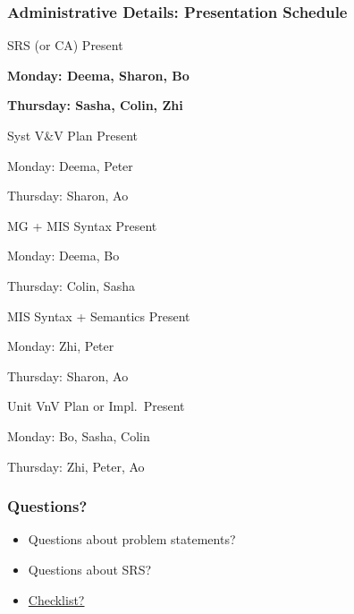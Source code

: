 \documentclass[t,12pt,numbers,fleqn]{beamer}
\newcounter{temp}
\begin{document}
\begin{frame}
\frametitle{Administrative Details: Presentation Schedule}

\bi
\item SRS (or CA) Present
\bi
\item \textbf{Monday: Deema, Sharon, Bo}
\item \textbf{Thursday: Sasha, Colin, Zhi}
\ei
\item Syst V\&V Plan Present
\bi
\item Monday: Deema, Peter
\item Thursday: Sharon, Ao
\ei
\item MG + MIS Syntax Present
\bi
\item Monday:  Deema, Bo
\item Thursday: Colin, Sasha
\ei
\item MIS Syntax + Semantics Present
\bi
\item Monday: Zhi, Peter
\item Thursday:  Sharon, Ao
\ei
\item Unit VnV Plan or Impl.\ Present
\bi
\item Monday: Bo, Sasha, Colin
\item Thursday: Zhi, Peter, Ao
\ei

\ei

\end{frame}


\begin{frame}
\frametitle{Questions?}
\begin{itemize}
\item Questions about problem statements?
\item Questions about SRS?
  \item
  \href{https://gitlab.cas.mcmaster.ca/smiths/cas741/blob/master/BlankProjectTemplate/docs/SRS/SRS-Checklist.pdf} {Checklist?}
\end{itemize}
\end{frame}


\end{document}
